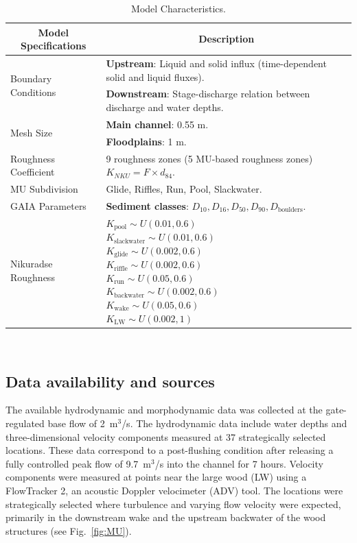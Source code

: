 \documentclass[draft,linenumbers,onecolumn]{agujournal2019} %
\begin{document}
\begin{table}[H] 
	\centering
	\caption{Model Characteristics.}
\begin{tabular}{p{4cm} p{10cm}}
	\hline
	\multicolumn{1}{c}{\textbf{Model Specifications}} & \multicolumn{1}{c}{\textbf{Description}} \\ \hline
	\multirow{2}{4cm}{Boundary Conditions} & \textbf{Upstream}: Liquid and solid influx (time-dependent solid and liquid fluxes). \\ 
	& \textbf{Downstream}: Stage-discharge relation between discharge and water depths. \\ \hline
	\multirow{2}{4cm}{Mesh Size} & \textbf{Main channel}: 0.55 m. \\ 
	& \textbf{Floodplains}: 1 m. \\ \hline
	Roughness Coefficient & 9 roughness zones (5 MU-based roughness zones) \( K_{NKU} = F \times d_{84} \). \\ \hline
	MU Subdivision & Glide, Riffles, Run, Pool, Slackwater. \\ \hline
	GAIA Parameters & \textbf{Sediment classes}: \( D_{10}, D_{16}, D_{50}, D_{90}, D_{\text{boulders}} \). \\ \hline
	Nikuradse Roughness & 
	\parbox[t]{10cm}{
		\( K_{\text{pool}} \sim U(0.01, 0.6) \)\\
		\( K_{\text{slackwater}} \sim U(0.01, 0.6) \)\\
		\( K_{\text{glide}} \sim U(0.002, 0.6) \)\\
		\( K_{\text{riffle}} \sim U(0.002, 0.6) \)\\
		\( K_{\text{run}} \sim U(0.05, 0.6) \)\\
		\( K_{\text{backwater}} \sim U(0.002, 0.6) \)\\
		\( K_{\text{wake}} \sim U(0.05, 0.6) \)\\
		\( K_{\text{LW}} \sim U(0.002, 1) \)
	} \\ \hline
\end{tabular}
	\label{tab:model_characteristics}
\end{table}
 \vspace{-20pt}      
\FloatBarrier
\subsection{Data availability and sources}
\label{sec:Sec2.3}
The available hydrodynamic and morphodynamic data was collected at the gate-regulated base flow of 2~m$^3$/s. 
The hydrodynamic data include water depths and three-dimensional velocity components measured at 37 strategically selected locations. 
These data correspond to a post-flushing condition after releasing a fully controlled peak flow of 9.7~m$^3$/s into the channel for 7 hours. 
Velocity components were measured at points near the large wood (LW) using a FlowTracker 2, an acoustic Doppler velocimeter (ADV) tool. 
The locations were strategically selected where turbulence and varying flow velocity were expected, primarily in the downstream wake and the upstream backwater of the wood structures \cite{schalko2024flow}(see Fig.~\ref{fig:MU}). 
\end{document}
